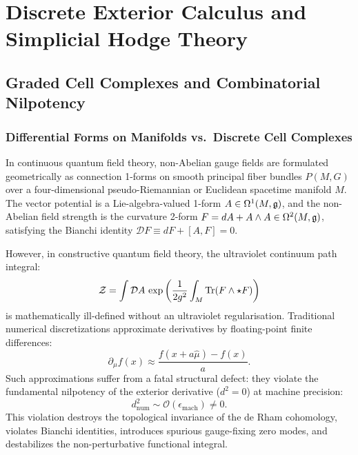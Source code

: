 \chapter{Discrete Exterior Calculus and Simplicial Hodge Theory}
\label{ch:dec}
\label{ch:dec_simplicial_hodge}

\section{Graded Cell Complexes and Combinatorial Nilpotency}
\label{sec:cell_complexes}

\subsection{Differential Forms on Manifolds vs.\ Discrete Cell Complexes}
\label{subsec:diff_forms_vs_discrete}

In continuous quantum field theory, non-Abelian gauge fields are formulated geometrically as connection 1-forms on smooth principal fiber bundles $P(M, G)$ over a four-dimensional pseudo-Riemannian or Euclidean spacetime manifold $M$. The vector potential is a Lie-algebra-valued 1-form $A \in \Omega^1(M, \mathfrak{g})$, and the non-Abelian field strength is the curvature 2-form $F = dA + A \wedge A \in \Omega^2(M, \mathfrak{g})$, satisfying the Bianchi identity $\mathcal{D} F \equiv dF + [A, F] = 0$.

However, in constructive quantum field theory, the ultraviolet continuum path integral:
\begin{equation}
\label{eq:continuum_path_integral_symbolic}
\mathcal{Z} = \int \mathcal{D}A \, \exp\left( \frac{1}{2g^2} \int_M \mathrm{Tr}(F \wedge \star F) \right)
\end{equation}
is mathematically ill-defined without an ultraviolet regularisation. Traditional numerical discretizations approximate derivatives by floating-point finite differences:
\begin{equation}
\partial_\mu f(x) \approx \frac{f(x + a \hat{\mu}) - f(x)}{a}.
\end{equation}
Such approximations suffer from a fatal structural defect: they violate the fundamental nilpotency of the exterior derivative ($d^2 = 0$) at machine precision:
\begin{equation}
d_{\mathrm{num}}^2 \sim \mathcal{O}(\epsilon_{\mathrm{mach}}) \neq 0.
\end{equation}
This violation destroys the topological invariance of the de Rham cohomology, violates Bianchi identities, introduces spurious gauge-fixing zero modes, and destabilizes the non-perturbative functional integral.

